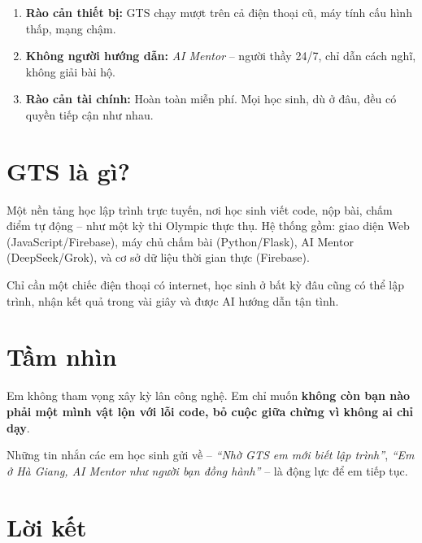 \documentclass[12pt,a4paper]{article}
\begin{document}
\begin{enumerate}





  \item \textbf{Rào cản thiết bị:} GTS chạy mượt trên cả điện thoại cũ, máy tính cấu hình thấp, mạng chậm.
  \item \textbf{Không người hướng dẫn:} \textit{AI Mentor} -- người thầy 24/7, chỉ dẫn cách nghĩ, không giải bài hộ.
  \item \textbf{Rào cản tài chính:} Hoàn toàn miễn phí. Mọi học sinh, dù ở đâu, đều có quyền tiếp cận như nhau.
\end{enumerate}


\section*{GTS là gì?}


Một nền tảng học lập trình trực tuyến, nơi học sinh viết code, nộp bài, chấm điểm tự động -- như một kỳ thi Olympic thực thụ. Hệ thống gồm: giao diện Web (JavaScript/Firebase), máy chủ chấm bài (Python/Flask), AI Mentor (DeepSeek/Grok), và cơ sở dữ liệu thời gian thực (Firebase).








Chỉ cần một chiếc điện thoại có internet, học sinh ở bất kỳ đâu cũng có thể lập trình, nhận kết quả trong vài giây và được AI hướng dẫn tận tình.


\section*{Tầm nhìn}













Em không tham vọng xây kỳ lân công nghệ. Em chỉ muốn \textbf{không còn bạn nào phải một mình vật lộn với lỗi code, bỏ cuộc giữa chừng vì không ai chỉ dạy}.


Những tin nhắn các em học sinh gửi về -- \textit{``Nhờ GTS em mới biết lập trình''}, \textit{``Em ở Hà Giang, AI Mentor như người bạn đồng hành''} -- là động lực để em tiếp tục.


\section*{Lời kết}
\end{document}
